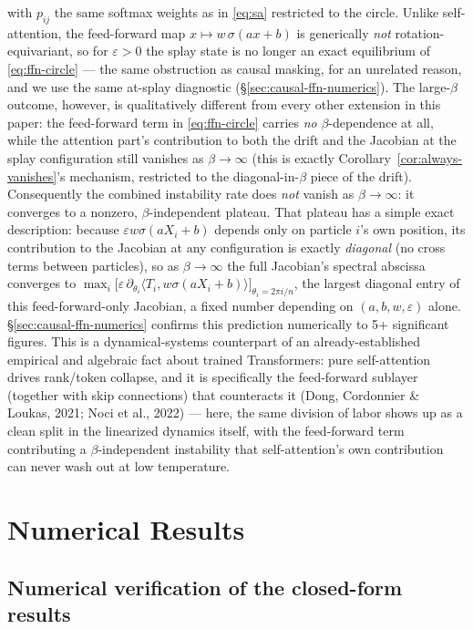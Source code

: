 \documentclass[11pt]{article}
\begin{document}
with $p_{ij}$ the same softmax weights as in \eqref{eq:sa} restricted to the circle. Unlike self-attention, the feed-forward map $x\mapsto w\,\sigma(ax+b)$ is generically \emph{not} rotation-equivariant, so for $\varepsilon>0$ the splay state is no longer an exact equilibrium of \eqref{eq:ffn-circle} --- the same obstruction as causal masking, for an unrelated reason, and we use the same at-splay diagnostic (\S\ref{sec:causal-ffn-numerics}). The large-$\beta$ outcome, however, is qualitatively different from every other extension in this paper: the feed-forward term in \eqref{eq:ffn-circle} carries \emph{no} $\beta$-dependence at all, while the attention part's contribution to both the drift and the Jacobian at the splay configuration still vanishes as $\beta\to\infty$ (this is exactly Corollary~\ref{cor:always-vanishes}'s mechanism, restricted to the diagonal-in-$\beta$ piece of the drift). Consequently the combined instability rate does \emph{not} vanish as $\beta\to\infty$: it converges to a nonzero, $\beta$-independent plateau. That plateau has a simple exact description: because $\varepsilon w\sigma(aX_i+b)$ depends only on particle $i$'s own position, its contribution to the Jacobian at any configuration is exactly \emph{diagonal} (no cross terms between particles), so as $\beta\to\infty$ the full Jacobian's spectral abscissa converges to $\max_i\big[\varepsilon\,\partial_{\theta_i}\langle T_i, w\sigma(aX_i+b)\rangle\big]_{\theta_i=2\pi i/n}$, the largest diagonal entry of this feed-forward-only Jacobian, a fixed number depending on $(a,b,w,\varepsilon)$ alone. \S\ref{sec:causal-ffn-numerics} confirms this prediction numerically to 5+ significant figures. This is a dynamical-systems counterpart of an already-established empirical and algebraic fact about trained Transformers: pure self-attention drives rank/token collapse, and it is specifically the feed-forward sublayer (together with skip connections) that counteracts it (Dong, Cordonnier \& Loukas, 2021; Noci et al., 2022) --- here, the same division of labor shows up as a clean split in the linearized dynamics itself, with the feed-forward term contributing a $\beta$-independent instability that self-attention's own contribution can never wash out at low temperature.

\section{Numerical Results}
\label{sec:numerics}

\subsection{Numerical verification of the closed-form results}
\label{sec:verification}
\end{document}
